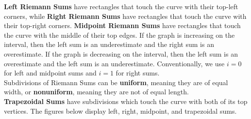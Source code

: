         \noindent \textbf{Left Riemann Sums} have rectangles that touch the curve with their
        top-left corners, while \textbf{Right Riemann Sums} have rectangles that touch the curve
        with their top-right corners. \textbf{Midpoint Riemann Sums} have rectangles that touch
        the curve with the middle of their top edges. If the graph is increasing on the interval,
        then the left sum is an underestimate and the right sum is an overestimate. If the graph
        is decreasing on the interval, then the left sum is an overestimate and the left sum is
        an underestimate. Conventionally, we use $i=0$ for left and midpoint sums and $i=1$ for
        right sums. \\

        \noindent Subdivisions of Riemann Sums can be \textbf{uniform}, meaning they are of
        equal width, or \textbf{nonuniform}, meaning they are not of equal length. \\

        \noindent \textbf{Trapezoidal Sums} have subdivisions which touch the curve with both of
        its top vertices. The figures below display left, right, midpoint, and trapezoidal sums.

